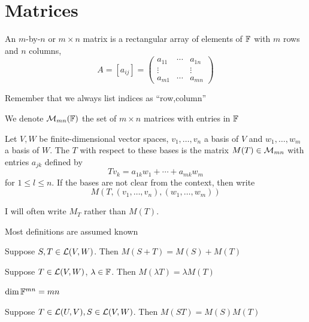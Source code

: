 \documentclass[aspectratio=169]{beamer}
\begin{document}
\section{Matrices}


\begin{frame}
\begin{definition}[Matrix]
An $m$-by-$n$ or $m\times n$ matrix is a rectangular array of elements of $\mathbb{F}$ with $m$ rows and $n$ columns,
\[
A=[a_{ij}]=
\begin{pmatrix}
a_{11} & \cdots & a_{1n} \\
\vdots & & \vdots \\
a_{m1} & \cdots & a_{mn}
\end{pmatrix}
\]
\end{definition}

Remember that we always list indices as ``row,column''

We denote $\mathcal{M}_{mn}(\mathbb{F})$ the set of $m\times n$ matrices with entries in $\mathbb{F}$
\end{frame}


\begin{frame}
\begin{definition}
Let $V,W$ be finite-dimensional vector spaces, $v_1,\ldots,v_n$ a basis of $V$ and $w_1,\ldots,w_m$ a basis of $W$. The  $T$ with respect to these bases is the matrix $M(T)\in\mathcal{M}_{mn}$ with entries $a_{jk}$ defined by
\[
Tv_k = a_{1k}w_1+\cdots +a_{mk}w_m
\]
for $1\leq l\leq n$.
If the bases are not clear from the context, then write
\[
M(T,(v_1,\ldots,v_n),(w_1,\ldots,w_m))
\]
\end{definition}
I will often write $M_T$ rather than $M(T)$.
\end{frame}


\begin{frame}
Most definitions are assumed known

\begin{theorem}
Suppose $S,T\in\mathcal{L}(V,W)$. Then $M(S+T)=M(S)+M(T)$
\end{theorem}

\begin{theorem}
Suppose $T\in\mathcal{L}(V,W)$, $\lambda\in\mathbb{F}$. Then $M(\lambda T)=\lambda M(T)$
\end{theorem}

\begin{theorem}[Dimension of $\M_{mn}$]
$\dim \mathbb{F}^{mn}=mn$
\end{theorem}

\begin{theorem}
Suppose $T\in\mathcal{L}(U,V),S\in\mathcal{L}(V,W)$. Then $M(ST)=M(S)M(T)$
\end{theorem}
\end{frame}
\end{document}
